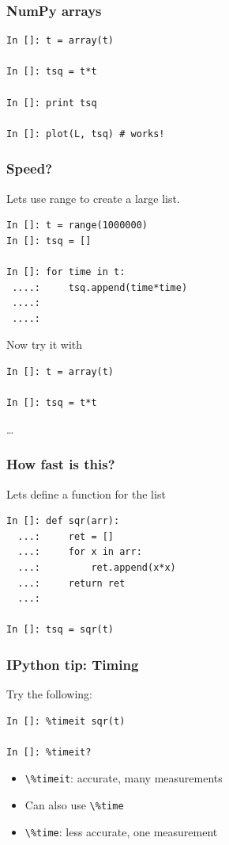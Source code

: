\documentclass[14pt,compress]{beamer}
\newcounter{time}
\newcommand{\typ}[1]{\lstinline{#1}}
\begin{document}
\begin{frame}[fragile]
\frametitle{NumPy arrays}
\begin{lstlisting} 
In []: t = array(t)

In []: tsq = t*t

In []: print tsq

In []: plot(L, tsq) # works!
\end{lstlisting}  %
\end{frame}


\begin{frame}[fragile]
\frametitle{Speed?}

\noindent Lets use range to create a large list.

\begin{lstlisting} 
In []: t = range(1000000)
In []: tsq = []

In []: for time in t:
 ....:     tsq.append(time*time)
 ....:
 ....:
\end{lstlisting}  %

\noindent Now try it with 

\begin{lstlisting}
In []: t = array(t)

In []: tsq = t*t
\end{lstlisting}
\ldots
\end{frame}

\begin{frame}[fragile]
\frametitle{How fast is this?}
\noindent Lets define a function for the list
\begin{lstlisting}
In []: def sqr(arr):
  ...:     ret = []
  ...:     for x in arr:
  ...:         ret.append(x*x)
  ...:     return ret
  ...: 

In []: tsq = sqr(t)

\end{lstlisting}  %
\end{frame}

\begin{frame}[fragile]
  \frametitle{IPython tip: Timing}

Try the following:
  \begin{lstlisting}
In []: %timeit sqr(t) 

In []: %timeit?

  \end{lstlisting}

  \begin{itemize}
      \item \typ{\%timeit}: accurate, many measurements
      \item Can also use \typ{\%time}
      \item \typ{\%time}: less accurate, one measurement 
  \end{itemize}

\end{frame}
\end{document}
